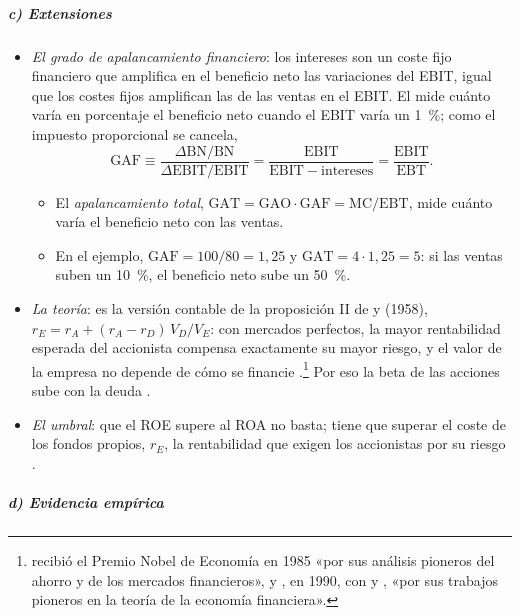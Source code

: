 \documentclass[11pt]{article}
\begin{document}
\subparagraph{c) Extensiones}

\begin{itemize}
\item \emph{El grado de apalancamiento financiero}: los intereses son un coste fijo financiero que amplifica en el beneficio neto las variaciones del EBIT, igual que los costes fijos amplifican las de las ventas en el EBIT. El  mide cuánto varía en porcentaje el beneficio neto cuando el EBIT varía un 1~\%; como el impuesto proporcional se cancela,
  \[
  \mathrm{GAF}\equiv\frac{\Delta\mathrm{BN}/\mathrm{BN}}{\Delta\mathrm{EBIT}/\mathrm{EBIT}}=\frac{\mathrm{EBIT}}{\mathrm{EBIT}-\text{intereses}}=\frac{\mathrm{EBIT}}{\mathrm{EBT}}.
  \]
  \begin{itemize}
  \item El \emph{apalancamiento total}, $\mathrm{GAT}=\mathrm{GAO}\cdot\mathrm{GAF}=\mathrm{MC}/\mathrm{EBT}$, mide cuánto varía el beneficio neto con las ventas.
  \item En el ejemplo, $\mathrm{GAF}=100/80=1{,}25$ y $\mathrm{GAT}=4\cdot1{,}25=5$: si las ventas suben un 10~\%, el beneficio neto sube un 50~\%.
  \end{itemize}
\item \emph{La teoría}: es la versión contable de la proposición II de  y  (1958), $r_E=r_A+(r_A-r_D)\,V_D/V_E$: con mercados perfectos, la mayor rentabilidad esperada del accionista compensa exactamente su mayor riesgo, y el valor de la empresa no depende de cómo se financie \nocite{ModiglianiMiller1958Cost}.\footnote{ recibió el Premio Nobel de Economía en 1985 «por sus análisis pioneros del ahorro y de los mercados financieros»\nocite{Nobel1985Modigliani}, y , en 1990, con  y , «por sus trabajos pioneros en la teoría de la economía financiera»\nocite{Nobel1990Markowitz}.} Por eso la beta de las acciones sube con la deuda .
\item \emph{El umbral}: que el ROE supere al ROA no basta; tiene que superar el coste de los fondos propios, $r_E$, la rentabilidad que exigen los accionistas por su riesgo .
\end{itemize}

\subparagraph{d) Evidencia empírica}
\end{document}

